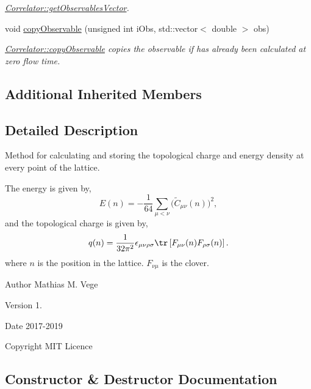 \begin{DoxyCompactItemize}
\begin{DoxyCompactList}\small\item\em \mbox{\hyperlink{class_correlator_a7fb062b098beb078f3e546f4717b4941}{Correlator\+::get\+Observables\+Vector}}. \end{DoxyCompactList}\item 
void \mbox{\hyperlink{class_lattice_action_charge_density_aef63c9fba819e838a87b509d53be248b}{copy\+Observable}} (unsigned int i\+Obs, std\+::vector$<$ double $>$ obs)
\begin{DoxyCompactList}\small\item\em \mbox{\hyperlink{class_correlator_ac780d8b180294ee4801ede6e6a13f7f4}{Correlator\+::copy\+Observable}} copies the observable if has already been calculated at zero flow time. \end{DoxyCompactList}\end{DoxyCompactItemize}
\subsection*{Additional Inherited Members}


\subsection{Detailed Description}
Method for calculating and storing the topological charge and energy density at every point of the lattice. 

The energy is given by, \[ E(n) = -\frac{1}{64} \sum_{\mu<\nu} \big(\tilde{C}_{\mu\nu}(n)\big)^2, \] and the topological charge is given by, \[ q(n) = \frac{1}{32\pi^2} \epsilon_{\mu\nu\rho\sigma} \tr\left[F_{\mu\nu}(n)F_{\rho\sigma}(n)\right]. \] where $n$ is the position in the lattice. $F_{\nu\mu}$ is the clover.

\begin{DoxyAuthor}{Author}
Mathias M. Vege 
\end{DoxyAuthor}
\begin{DoxyVersion}{Version}
1. 
\end{DoxyVersion}
\begin{DoxyDate}{Date}
2017-\/2019 
\end{DoxyDate}
\begin{DoxyCopyright}{Copyright}
M\+IT Licence 
\end{DoxyCopyright}


\subsection{Constructor \& Destructor Documentation}
\mbox{\label{class_lattice_action_charge_density_acda2a43db75cca34586441d4ac7ec39e}} 
